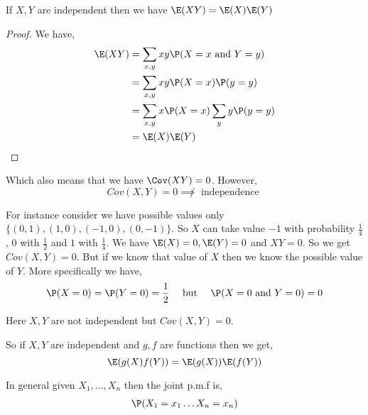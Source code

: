 \begin{theorem}
	If $X, Y$ are independent then we have $\E(XY) = \E(X) \E(Y)$
\end{theorem}
\begin{proof}
	We have, 
	\begin{align*}
		\E(XY) &= \sum_{x,y} xy \P(X = x \text{ and } Y = y)\\
		       &= \sum_{x,y} x y \P(X = x) \P(y = y)\\
		       &= \sum_{x,y} x   \P(X = x) \sum_y y \P(y = y)\\
			&= \E(X) \E(Y)
	\end{align*}

\end{proof}
\begin{remark}
	Which also means that we have $\Cov(XY) = 0$. However,
	$$
		Cov(X, Y) = 0 \not \implies \text{ independence }
	$$

	For instance consider we have possible values only $\{(0, 1), (1, 0), (-1, 0), (0, -1)\}$. So $X$ can take value $-1$ with probability $\frac{1}{4}$, $0$ with $\frac{1}{2}$ and $1$ with $\frac{1}{4}$. We have $\E(X) = 0, \E(Y) = 0$ and $XY = 0$. So we get $Cov(X,Y) = 0$. But if we know that value of $X$ then we know the possible value of $Y$.  More specifically we have,
	$$
		\P(X = 0) = \P(Y = 0)= \frac{1}{2}\quad \text{ but } \quad \P(X = 0 \text{ and } Y = 0) = 0
	$$
 
	\vspace{1em}
	
	Here $X,Y$ are not independent but $Cov(X,Y) = 0$. 
\end{remark}


\begin{remark}
	So if $X, Y$ are independent and $g,f$ are functions then we get,
	$$
		\E(g(X) f(Y)) = \E(g(X)) \E(f(Y))
	$$
\end{remark}	

\begin{definition}
In general given $X_{1}, \dots, X_n$ then the joint p.m.f is, 
\begin{align*}
	\P(X_{1} = x_{1} \dots X_n = x_n)
\end{align*}
\end{definition}

